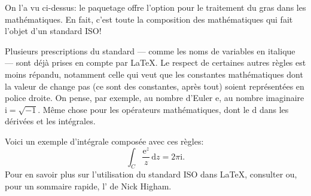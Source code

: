 \begin{information}
  On l'a vu ci-dessus: le paquetage  offre l'option
   pour le traitement du gras dans les mathématiques. En
  fait, c'est toute la composition des mathématiques qui fait l'objet
  d'un standard ISO!

  Plusieurs prescriptions du standard --- comme les noms de variables
  en italique --- sont déjà prises en compte par {\LaTeX}. Le respect
  de certaines autres règles est moins répandu, notamment celle qui
  veut que les constantes mathématiques dont la valeur de change pas
  (ce sont des constantes, après tout) soient représentées en police
  droite. On pense, par exemple, au nombre d'Euler $\mathrm{e}$, au
  nombre imaginaire $\mathrm{i} = \sqrt{-1}$. Même chose pour les
  opérateurs mathématiques, dont le $\mathrm{d}$ dans les dérivées et
  les intégrales.

  Voici un exemple d'intégrale composée avec ces règles:
  \begin{equation*}
    \int_C \frac{\mathrm{e}^z}{z}\, \mathrm{d}z = 2 \pi \mathrm{i}.
  \end{equation*}
  Pour en savoir plus sur l'utilisation du standard ISO dans {\LaTeX},
  consulter \citet{Beccari:ISO} ou, pour un sommaire rapide, l'%
  de Nick Higham.
\end{information}


